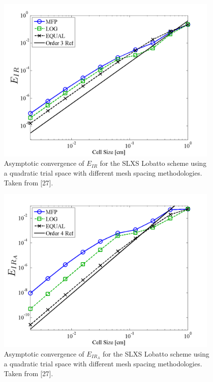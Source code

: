 %
%
\begin{figure}[!htp]
\centering
\includegraphics[width=11cm]{chapter3_variable_xs/P2_LOBATTO_E_IR.png}
\caption{Asymptotic convergence of $E_{IR}$ for the SLXS Lobatto scheme using a quadratic trial space with different mesh spacing methodologies.  Taken from [27].} 
\label{fig:lobatto_spacing_ir}
\end{figure}
%
%
\begin{figure}[!hbp]
\centering
\includegraphics[width=11cm]{chapter3_variable_xs/P2_LOBATTO_E_IR_A.png}
\caption{Asymptotic convergence of $E_{IR_A}$ for the SLXS Lobatto scheme using a quadratic trial space with different mesh spacing methodologies.  Taken from [27].}
\label{fig:lobatto_spacing_ir_A}
\end{figure}
%
%

